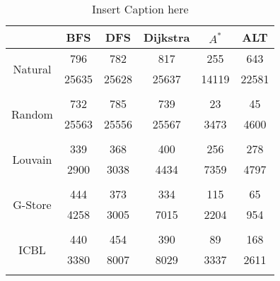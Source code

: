 \begin{table}
	\begin{center}
		 \begin{tabular}[c]{c c c c c c} \toprule
			  & BFS & DFS & Dijkstra & $A^*$  & ALT \\ \midrule 
 			\multirow{2}{*}{Natural}  & 796 & 782 & 817 & 255 & 643 \\ 
 				 & 25635 & 25628 & 25637 & 14119 & 22581 \\ 
 				&&&&& \\[-0.5em]
 			\multirow{2}{*}{Random}  & 732 & 785 & 739 & 23 & 45 \\ 
 				 & 25563 & 25556 & 25567 & 3473 & 4600 \\ 
 				&&&&& \\[-0.5em]
 			\multirow{2}{*}{Louvain}  & 339 & 368 & 400 & 256 & 278 \\ 
 				 & 2900 & 3038 & 4434 & 7359 & 4797 \\ 
 				&&&&& \\[-0.5em]
 			\multirow{2}{*}{G-Store}  & 444 & 373 & 334 & 115 & 65 \\ 
 				 & 4258 & 3005 & 7015 & 2204 & 954 \\ 
 				&&&&& \\[-0.5em]
 			\multirow{2}{*}{ICBL}  & 440 & 454 & 390 & 89 & 168 \\ 
 				 & 3380 & 8007 & 8029 & 3337 & 2611 \\ 
 				&&&&& \\[-0.5em]
 					\end{tabular}  
  	 \end{center}
	 \caption{ Insert Caption here}
\end{table}